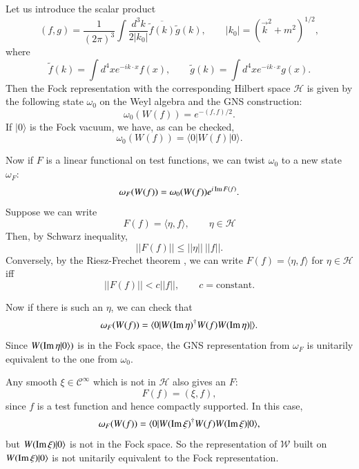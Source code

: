 Let us introduce the scalar product
$$
(f,g)=\frac{1}{(2\pi)^{3}}\int \dfrac{d^{3}k}{2|k_{0}|}\overline{\widetilde{f}(k)}\widetilde{g}(k),\qquad |k_{0}|=(\overrightarrow{k}^{2}+m^{2})^{1/2},
$$
where
\begin{equation}
\widetilde{f}(k)=\int d^{4}xe^{-ik\cdot x}f(x),\qquad \widetilde{g}(k)=\int d^{4}xe^{-ik\cdot x}g(x).\label{chap4-eq2.17}
\end{equation}
Then the Fock representation with the corresponding Hilbert space $\mathcal{H}$ is given by the following state $\omega_{0}$ on the Weyl algebra and the GNS construction:
\begin{equation}
\omega_{0}(W(f))=e^{-(f,f)/2}.\label{chap4-eq2.18}
\end{equation}
If $|0\rangle$ is the Fock vacuum, we have, as can be checked,
\begin{equation}
\omega_{0}(W(f))=\langle 0|W (f)|0\rangle.\label{chap4-eq2.19}
\end{equation}

Now if $F$ is a linear functional on test functions, we can twist $\omega_{0}$ to a new state $\omega_{F}$:
\begin{equation}
\omega_{F}(W(f))=\omega_{0}(W(f))e^{i \operatorname{\mathrm{Im}} F(f)}.\label{chap4-eq2.20} 
\end{equation}
Suppose we can write
\begin{equation}
F(f) = \langle\eta, f\rangle, \qquad \eta \in \mathcal{H} \label{chap4-eq2.21}
\end{equation}
Then, by Schwarz inequality,
\begin{equation}
|| F(f) || \leq ||\eta || ~ || f ||.\label{chap4-eq2.22}
\end{equation}
Conversely, by the Riesz-Frechet theorem \cite{chap4-key9}, we can write $F(f)= \langle \eta, f\rangle$ for $\eta \in \mathcal{H}$ iff
\begin{equation}
|| F(f) || < c || f||, \qquad c= \text{constant}. \label{chap4-eq2.23}
\end{equation}

Now if there is such an $\eta$, we can check that
\begin{equation}
\omega_F (W (f))= \langle 0| W (\operatorname{\mathrm{Im}} \eta)^\dagger W (f)W (\operatorname{\mathrm{Im}} \eta)|\rangle. \label{chap4-eq2-24}
\end{equation}
Since $W(\operatorname{\mathrm{Im}} \eta | 0 \rangle)$ is in the Fock space, the GNS representation from $\omega_F$ is unitarily equivalent to the one from $\omega_0$.

Any smooth $\xi \in \mathcal{C}^\infty$ which is not in $\mathcal{H}$ also gives an $F$:
\begin{equation}
  F(f)= (\xi, f), \label{chap4-eq2.25}
\end{equation}
since $f$ is a test function and hence compactly supported. In this case,
\begin{equation}
\omega_F (W(f))= \langle 0| W (\operatorname{\mathrm{Im}} \xi)^\dagger W (f)W (\operatorname{\mathrm{Im}} \xi)|0\rangle, \label{chap4-eq2.26}
\end{equation}
but $W (\operatorname{\mathrm{Im}} \xi)|0 \rangle$ is not in the Fock space. So the representation of $\mathcal{W}$ built on $W (\operatorname{\mathrm{Im}} \xi)|0 \rangle$ is not unitarily equivalent to the Fock representation.


